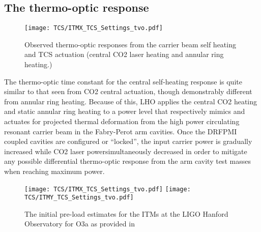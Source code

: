 \subsection{The thermo-optic response}
\begin{figure}[!ht]
  \centering
  \begin{subcaptiongroup}
	  \texttt{[image: TCS/ITMX\_TCS\_Settings\_tvo.pdf]}
	  \label{TO_response}
  \end{subcaptiongroup}
  \captionsetup{subrefformat=parens}
  \hfill
  \caption{Observed thermo-optic responses from the carrier beam self heating and TCS actuation (central CO2 laser heating and annular ring heating.)} 
\label{fig:thermooptic_response}
\end{figure}
The thermo-optic time constant for the central self-heating response is quite similar to that seen from CO2 central actuation, though demonstrably different from annular ring heating. Because of this, LHO applies the central CO2 heating and static annular ring heating to a power level that respectively mimics and actuates for projected thermal deformation from the high power circulating resonant carrier beam in the Fabry-Perot arm cavities. Once the DRFPMI coupled cavities are configured or ``locked'', the input carrier power is gradually increased while CO2 laser powersimultaneously decreased in order to mitigate any possible differential thermo-optic response from the arm cavity test masses when reaching maximum power.
\begin{figure}[!ht]
  \centering
  \begin{subcaptiongroup}
	  \texttt{[image: TCS/ITMX\_TCS\_Settings\_tvo.pdf]}
	  \label{ITMX_TCS}
	  \texttt{[image: TCS/ITMY\_TCS\_Settings\_tvo.pdf]}
	  \label{ITMY_TCS}
  \end{subcaptiongroup}
  \captionsetup{subrefformat=parens}
  \hfill
  \caption{The initial pre-load estimates for the ITMs at the LIGO Hanford Observatory for O3a as provided in \cite{tvo}} 
  \label{fig:O3_preload_tvo}
\end{figure}



